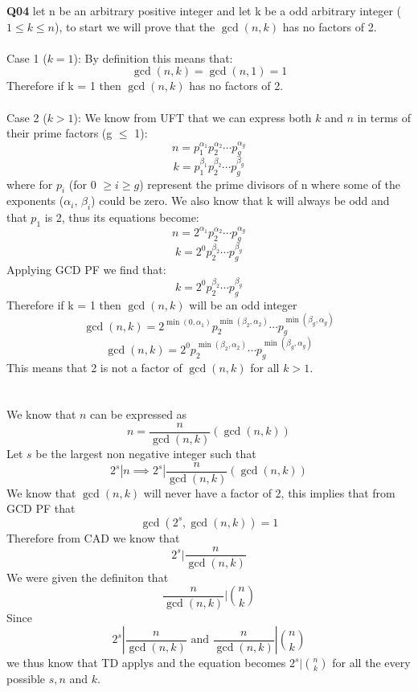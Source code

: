 \documentclass[11pt]{article}
\begin{document}
\textbf{Q04} let n be an arbitrary positive integer and let k be a odd arbitrary integer ($1 \leq k \leq n$), to start we will prove that the $\gcd(n,k)$ has no factors of 2.\\\\
Case 1 ($k = 1$):  By definition this means that:
\[ \gcd(n,k) = \gcd(n,1) = 1 \]
Therefore if k = 1 then $\gcd(n,k)$ has no factors of 2.\\\\
Case 2 ($k > 1$):  We know from UFT that we can express both $k$ and $n$ in terms of their prime factors (g $\leq$ 1):
\[ n = p_1^{\alpha_1}p_2^{\alpha_2}\cdots p_g^{\alpha_g} \]
\[ k = p_1^{\beta_1}p_2^{\beta_2}\cdots p_g^{\beta_g}  \]
where for $p_i$ (for 0 $\geq i \geq  g$) represent the prime divisors of n where some of the exponents ($\alpha_i$, $\beta_i$) could be zero. We also know that k will always be odd and that $p_1$ is 2, thus its equations become:
\[ n = 2^{\alpha_1}p_2^{\alpha_2}\cdots p_g^{\alpha_g} \]
\[ k = 2^{0}p_2^{\beta_2}\cdots p_g^{\beta_g}  \]
Applying GCD PF we find that:
\[ k = 2^{0}p_2^{\beta_2}\cdots p_g^{\beta_g}  \]
Therefore if k = 1 then $\gcd(n,k)$ will be an odd integer
\[ \gcd(n,k) = 2^{\min(0, \alpha_1)}p_2^{\min(\beta_2, \alpha_2)}\cdots p_g^{\min(\beta_g, \alpha_g)} \]
\[ \gcd(n,k) = 2^{0}p_2^{\min(\beta_2, \alpha_2)}\cdots p_g^{\min(\beta_g, \alpha_g)} \]
This means that 2 is not a factor of $\gcd(n,k)$ for all $k > 1$.\\\\\\
We know that $n$ can be expressed as
\[ n =\frac{n}{\gcd(n,k)}(\gcd(n,k)) \]
Let $s$ be the largest non negative integer such that
\[ 2^s | n \implies 2^s | \frac{n}{\gcd(n,k)}(\gcd(n,k))\]
We know that $\gcd(n,k)$ will never have a factor of 2, this implies that from GCD PF that
\[ \gcd(2^s, \gcd(n,k)) = 1\]
Therefore from CAD we know that
\[ 2^s | \frac{n}{\gcd(n,k)} \]
We were given the definiton that
\[ \frac{n}{\gcd(n, k)}|  \binom{n}{k} \]
Since
\[ 2^s | \frac{n}{\gcd(n,k)} \text{ and } \frac{n}{\gcd(n, k)}|  \binom{n}{k}\]
we thus know that TD applys and the equation becomes $2^s |  \binom{n}{k}$ for all the every possible $s,n$ and $k$.
\end{document}
